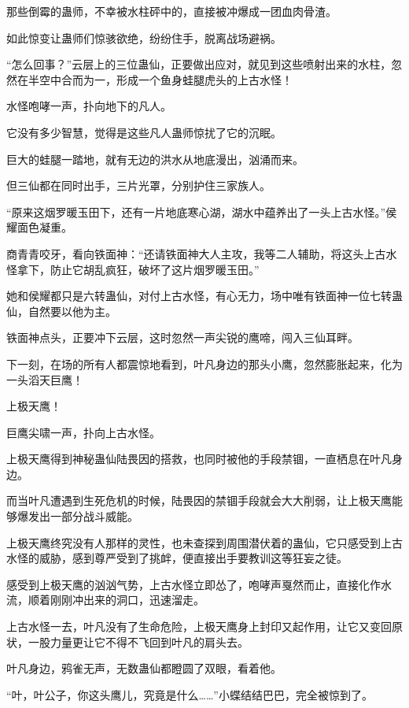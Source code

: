 
\begin{this_body}

那些倒霉的蛊师，不幸被水柱砰中的，直接被冲爆成一团血肉骨渣。

如此惊变让蛊师们惊骇欲绝，纷纷住手，脱离战场避祸。

“怎么回事？”云层上的三位蛊仙，正要做出应对，就见到这些喷射出来的水柱，忽然在半空中合而为一，形成一个鱼身蛙腿虎头的上古水怪！

水怪咆哮一声，扑向地下的凡人。

它没有多少智慧，觉得是这些凡人蛊师惊扰了它的沉眠。

巨大的蛙腿一踏地，就有无边的洪水从地底漫出，汹涌而来。

但三仙都在同时出手，三片光罩，分别护住三家族人。

“原来这烟罗暖玉田下，还有一片地底寒心湖，湖水中蕴养出了一头上古水怪。”侯耀面色凝重。

商青青咬牙，看向铁面神：“还请铁面神大人主攻，我等二人辅助，将这头上古水怪拿下，防止它胡乱疯狂，破坏了这片烟罗暖玉田。”

她和侯耀都只是六转蛊仙，对付上古水怪，有心无力，场中唯有铁面神一位七转蛊仙，自然要以他为主。

铁面神点头，正要冲下云层，这时忽然一声尖锐的鹰啼，闯入三仙耳畔。

下一刻，在场的所有人都震惊地看到，叶凡身边的那头小鹰，忽然膨胀起来，化为一头滔天巨鹰！

上极天鹰！

巨鹰尖啸一声，扑向上古水怪。

上极天鹰得到神秘蛊仙陆畏因的搭救，也同时被他的手段禁锢，一直栖息在叶凡身边。

而当叶凡遭遇到生死危机的时候，陆畏因的禁锢手段就会大大削弱，让上极天鹰能够爆发出一部分战斗威能。

上极天鹰终究没有人那样的灵性，也未查探到周围潜伏着的蛊仙，它只感受到上古水怪的威胁，感到尊严受到了挑衅，便直接出手要教训这等狂妄之徒。

感受到上极天鹰的汹汹气势，上古水怪立即怂了，咆哮声戛然而止，直接化作水流，顺着刚刚冲出来的洞口，迅速溜走。

上古水怪一去，叶凡没有了生命危险，上极天鹰身上封印又起作用，让它又变回原状，一股力量更让它不得不飞回到叶凡的肩头去。

叶凡身边，鸦雀无声，无数蛊仙都瞪圆了双眼，看着他。

“叶，叶公子，你这头鹰儿，究竟是什么……”小蝶结结巴巴，完全被惊到了。


\end{this_body}
